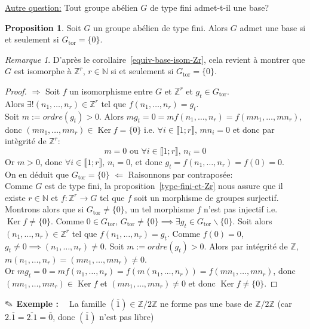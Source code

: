 \documentclass{report}
\newcommand{\Z}{\mathbb{Z}}
\newcommand{\N}{\mathbb{N}}
\renewcommand{\ker}{\mathop{\mathrm{Ker}}\nolimits}
\newcommand{\Gt}{G_{\mathrm{tor}}}
\newcommand{\direct}{\textcircled{$\Rightarrow$} }
\newcommand{\reciproque}{\textcircled{$\Leftarrow$} }
\newcommand{\ssi}{si et seulement si }
\newcommand{\nt}[1]{\llbracket  #1 \rrbracket }
\theoremstyle{definition}
\newtheorem{prop}[defi]{Proposition}
\theoremstyle{remark}
\newtheorem{rem}[defi]{Remarque}
\newcommand{\exem}{{\textbf{$\text{\ding{46}}$ Exemple : \ }}}
\newcommand{\aques}{\underline{Autre question:} }
\begin{document}
\aques Tout groupe ab\'elien $G$ de type fini admet-t-il une base?\medbreak
\begin{prop}
Soit $G$ un groupe ab\'elien de type fini. Alors $G$ admet une base \ssi $\Gt=\{0\}$.
\end{prop}
\begin{rem}
D'apr\`es le corollaire~\ref{equiv-base-isom-Zr}, cela revient \`a montrer que $G$ est isomorphe \`a $\Z^r$, $r\in\N$ \ssi $\Gt=\{0\}$.
\end{rem}
\begin{proof}
\direct %
Soit $f$ un isomorphisme entre $G$ et $\Z^r$ et $g_t\in\Gt$.\\
Alors $\exists! (n_1,\ldots,n_r)\in\Z^r$ tel que $f(n_1,\ldots,n_r)=g_t$.\\
Soit $m:=ordre(g_t)>0$.
Alors $mg_t=0=mf(n_1,\ldots,n_r)=f(mn_1,\ldots,mn_r)$, donc $(mn_1,\ldots,mn_r)\in \ker f=\{0\}$
i.e. $\forall i\in\nt{1;r},\, mn_i=0$ et donc par int\`egrit\'e de $\Z^r$: 
$$m=0\textrm{ ou }\forall i\in\nt{1;r},\, n_i=0$$
Or $m>0$, donc $\forall i\in\nt{1;r},\, n_i=0$, et donc $g_t=f(n_1,\ldots,n_r)=f(0)=0$.\\
On en d\'eduit que  $\Gt=\{0\}$\bigbreak
\reciproque Raisonnons par contrapos\'ee:\\
Comme $G$ est de type fini, la proposition~\ref{type-fini-et-Zr} nous assure que il existe $r\in\N$ et $f:\Z^r\to G$ tel que $f$ soit un morphisme de groupes surjectif.\\
Montrons alors que si $\Gt\neq \{0\}$, un tel morphisme $f$ n'est pas injectif i.e. $\ker f\neq\{0\}$.\smallbreak
Comme $0\in\Gt$, $\Gt\neq \{0\}\implies \exists g_t\in\Gt\backslash\{0\}$.
Soit alors $(n_1,\ldots,n_r)\in\Z^r$ tel que $f(n_1,\ldots,n_r)=g_t$.
Comme $f(0)=0$, $g_t\neq 0\implies (n_1,\ldots,n_r)\neq 0$.\smallbreak
Soit $m:=ordre(g_t)>0$. Alors par int\'egrit\'e de $\Z$, $m(n_1,\ldots,n_r)=(mn_1,\ldots,mn_r)\neq 0$.\\
Or $mg_t=0=mf(n_1,\ldots,n_r)=f(m(n_1,\ldots,n_r))=f(mn_1,\ldots,mn_r)$, donc\\
$(mn_1,\ldots,mn_r)\in\ker f$ et $(mn_1,\ldots,mn_r)\neq 0$ et donc $\ker f\neq \{0\}$.
\end{proof}
\exem
La famille $(\overline{1}) \in \Z/2\Z$ ne forme pas une base de $\Z/2\Z$ (car $2.\overline{1}=\overline{2.1}=\overline{0}$, donc $(\overline{1})$ n'est pas libre)\\
\end{document}
